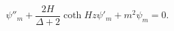 \begin{equation}
\psi''_{m} + \frac{2 H}{\Delta + 2} \coth{H z} \psi'_{m} + m^{2} \psi_{m} = 0.
\end{equation}

